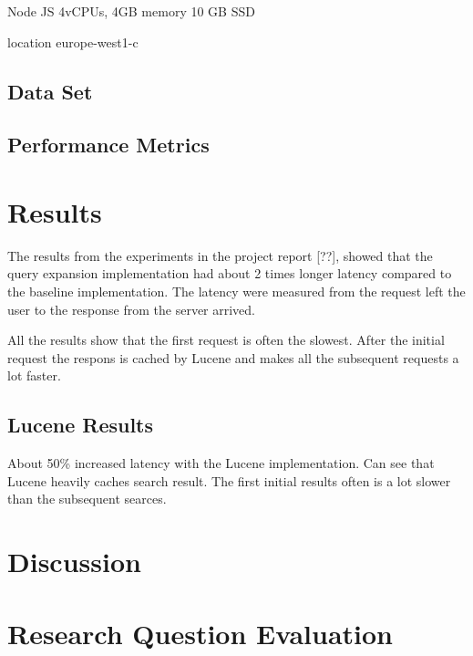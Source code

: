 Node JS
4vCPUs, 4GB memory
10 GB SSD

location europe-west1-c

\subsection{Data Set}
\label{sec:dataset}

\subsection{Performance Metrics}

\section{Results}
\label{sec:results}
The results from the experiments in the project report [??],
showed that the query expansion implementation had about 2 times longer latency compared to the baseline implementation.
The latency were measured from the request left the user to the response from the server arrived.

All the results show that the first request is often the slowest.
After the initial request the respons is cached by Lucene and makes all the subsequent requests a lot faster.

\subsection{Lucene Results}
About 50\% increased latency with the Lucene implementation.
Can see that Lucene heavily caches search result.
The first initial results often is a lot slower than the subsequent searces.

\section{Discussion}

\section{Research Question Evaluation}
